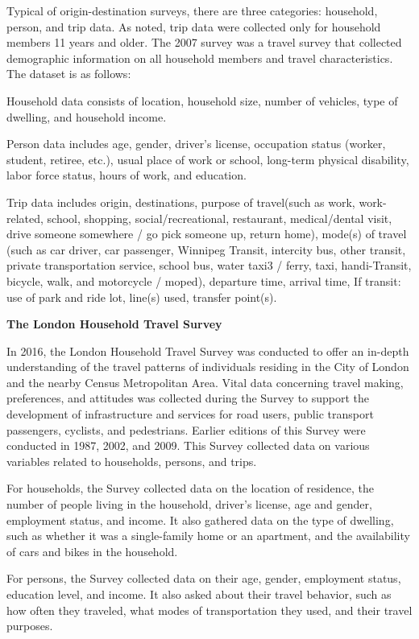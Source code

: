 \documentclass[
11pt, %
oneside, %
english, %
singlespacing, %
]{macthesis} %
\begin{document}
Typical of origin-destination surveys, there are three categories: household, person, and trip data. As noted, trip data were collected only for household members 11 years and older. The 2007 survey was a travel survey that collected demographic information on all household members and travel characteristics. The dataset is as follows:

Household data consists of location, household size, number of vehicles, type of dwelling, and household income.

Person data includes age, gender, driver's license, occupation status (worker, student, retiree, etc.), usual place of work or school, long-term physical disability, labor force status, hours of work, and education.

Trip data includes origin, destinations, purpose of travel(such as work, work-related, school, shopping, social/recreational, restaurant, medical/dental visit, drive someone somewhere / go pick someone up, return home), mode(s) of travel (such as car driver, car passenger, Winnipeg Transit, intercity bus, other transit, private transportation service, school bus, water taxi3 / ferry, taxi, handi-Transit, bicycle, walk, and motorcycle / moped), departure time, arrival time, If transit: use of park and ride lot, line(s) used, transfer point(s).

\newpage

\textbf{The London Household Travel Survey}

In 2016, the London Household Travel Survey was conducted to offer an in-depth understanding of the travel patterns of individuals residing in the City of London and the nearby Census Metropolitan Area. Vital data concerning travel making, preferences, and attitudes was collected during the Survey to support the development of infrastructure and services for road users, public transport passengers, cyclists, and pedestrians. Earlier editions of this Survey were conducted in 1987, 2002, and 2009. This Survey collected data on various variables related to households, persons, and trips.

For households, the Survey collected data on the location of residence, the number of people living in the household, driver's license, age and gender, employment status, and income. It also gathered data on the type of dwelling, such as whether it was a single-family home or an apartment, and the availability of cars and bikes in the household.

For persons, the Survey collected data on their age, gender, employment status, education level, and income. It also asked about their travel behavior, such as how often they traveled, what modes of transportation they used, and their travel purposes.
\end{document}
